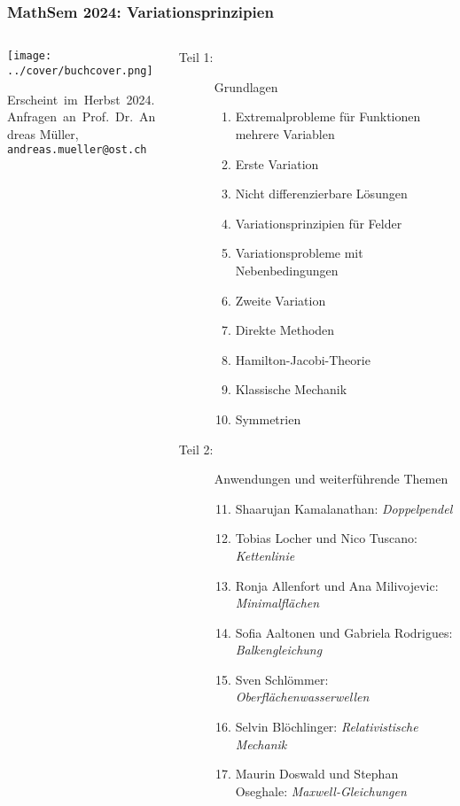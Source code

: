 \documentclass[handout]{beamer}
\title[]{}
\begin{document}
\begin{frame}
\frametitle{%
MathSem 2024: Variationsprinzipien}
\begin{columns}[t,onlytextwidth]
\begin{column}{0.32\textwidth}
\begin{center}
\texttt{[image: ../cover/buchcover.png]}
\end{center}
\vskip 0.2cm
\bigskip
\bigskip
Erscheint~im~Herbst~2024.\\
Anfragen~an~Prof.~Dr.~Andreas Müller,\\
{\texttt{andreas.mueller@ost.ch}}
\bigskip
\bigskip
\bigskip
\end{column}
%
\begin{column}{0.65\textwidth}
\begin{description}
\item[Teil 1:] Grundlagen
\begin{enumerate}
\item Extremalprobleme für Funktionen mehrere Variablen
\item Erste Variation
\item Nicht differenzierbare Lösungen
\item Variationsprinzipien für Felder
\item Variationsprobleme mit Nebenbedingungen
\item Zweite Variation
\item Direkte Methoden
\item Hamilton-Jacobi-Theorie
\item Klassische Mechanik
\item Symmetrien
\end{enumerate}
\item[Teil 2:] Anwendungen und weiterführende Themen
\begin{enumerate}
\setcounter{enumi}{10}
\item Shaarujan Kamalanathan: {\em Doppelpendel}
\item Tobias Locher und Nico Tuscano: {\em Kettenlinie}
\item Ronja Allenfort und Ana Milivojevic: {\em Minimalflächen}
\item Sofia Aaltonen und Gabriela Rodrigues: {\em Balkengleichung}
\item Sven Schlömmer: {\em Oberflächenwasserwellen}
\item Selvin Blöchlinger: {\em Relativistische Mechanik}
\item Maurin Doswald und Stephan Oseghale: {\em Maxwell-Gleichungen}

\end{enumerate}
\end{description}
\end{column}
\end{columns}
\end{frame}
\end{document}
